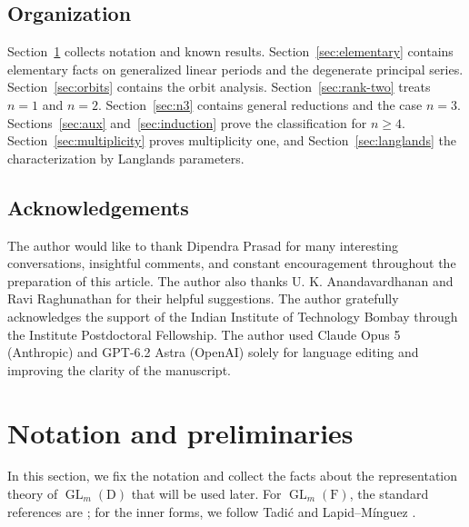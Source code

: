 \documentclass[11pt]{amsart}
\numberwithin{equation}{section}
\theoremstyle{plain}
\theoremstyle{definition}
\theoremstyle{remark}
\DeclareMathOperator{\GL}{GL}
\begin{document}
%
%

\subsection{Organization}
Section~\ref{sec:prelim} collects notation and known results. Section~\ref{sec:elementary} contains elementary facts on generalized linear periods and the degenerate principal series. Section~\ref{sec:orbits} contains the orbit analysis. Section~\ref{sec:rank-two} treats $n=1$ and $n=2$. Section~\ref{sec:n3} contains general reductions and the case $n=3$. Sections~\ref{sec:aux} and~\ref{sec:induction} prove the classification for $n\ge4$. Section~\ref{sec:multiplicity} proves multiplicity one, and Section~\ref{sec:langlands} the characterization by Langlands parameters. 

\subsection{Acknowledgements} The author would like to thank Dipendra Prasad for many interesting conversations, insightful comments, and constant encouragement throughout the preparation of this article. The author also thanks U. K. Anandavardhanan and Ravi Raghunathan for their helpful suggestions. The author gratefully acknowledges the support of the Indian Institute of Technology Bombay through the Institute Postdoctoral Fellowship.
The author used Claude Opus 5 (Anthropic) and GPT-6.2 Astra (OpenAI) solely for language editing and improving the clarity of the manuscript.


\section{Notation and preliminaries}\label{sec:prelim}

In this section, we fix the notation and collect the facts about the representation theory of $\GL_m(\mathrm{D})$ that will be used later. For $\GL_m(\mathrm{F})$, the standard references are \cite{BZ76,BZ77,Zel80}; for the inner forms, we follow Tadi\'c \cite{Tad90} and Lapid--M\'inguez \cite{LM16}.
\end{document}
